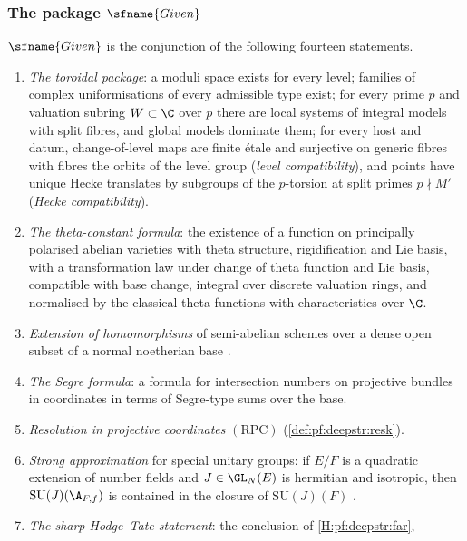 \subsubsection*{The package $\sfname{Given}$}

\begin{definition}\label{def:pf:deepstr:given}
$\sfname{Given}$ is the conjunction of the following fourteen statements.
\begin{enumerate}[label=(G\arabic*)]
\item\label{G:pf:deepstr:tor} \emph{The toroidal package}: a moduli space exists for every level; families
of complex uniformisations of every admissible type exist; for every prime $p$ and valuation subring
$W\subset\C$ over $p$ there are local systems of integral models with split fibres, and global models
dominate them; for every host and datum, change-of-level maps are finite \'etale and surjective on generic
fibres with fibres the orbits of the level group (\emph{level compatibility}), and points have unique
Hecke translates by subgroups of the $p$-torsion at split primes $p\nmid M'$ (\emph{Hecke compatibility}).
\item\label{G:pf:deepstr:key} \emph{The theta-constant formula}: the existence of a function on principally
polarised abelian varieties with theta structure, rigidification and Lie basis, with a transformation law
under change of theta function and Lie basis, compatible with base change, integral over discrete valuation
rings, and normalised by the classical theta functions with characteristics over $\C$.
\item\label{G:pf:deepstr:sah} \emph{Extension of homomorphisms} of semi-abelian schemes over a dense open
subset of a normal noetherian base \cite[Ch.~I, Prop.~2.7]{FaltingsChai1990}.
\item\label{G:pf:deepstr:segre} \emph{The Segre formula}: a formula for intersection numbers on projective
bundles in coordinates in terms of Segre-type sums over the base.
\item\label{G:pf:deepstr:resk} \emph{Resolution in projective coordinates} $\mathrm{(RPC)}$
(\cref{def:pf:deepstr:resk}).
\item\label{G:pf:deepstr:sa} \emph{Strong approximation} for special unitary groups: if $E/F$ is a
quadratic extension of number fields and $J\in\GL_N(E)$ is hermitian and isotropic, then
$\mathrm{SU}(J)(\A_{F,f})$ is contained in the closure of $\mathrm{SU}(J)(F)$ \cite{Kneser1966,PlatonovRapinchuk1994}.
\item\label{G:pf:deepstr:ht} \emph{The sharp Hodge--Tate statement}: the conclusion of \ref{H:pf:deepstr:far},

\end{enumerate}
\end{definition}
